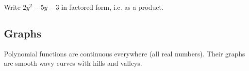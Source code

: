 \documentclass{ximera}
\begin{document}
\begin{question}

Write $2y^2-5y-3$ in factored form, i.e. as a product.



\begin{multipleChoice}
\end{multipleChoice}

\end{question}




























\subsection {Graphs}




Polynomial functions are continuous everywhere (all real numbers).  Their graphs are smooth wavy curves with hills and valleys.
\end{document}
